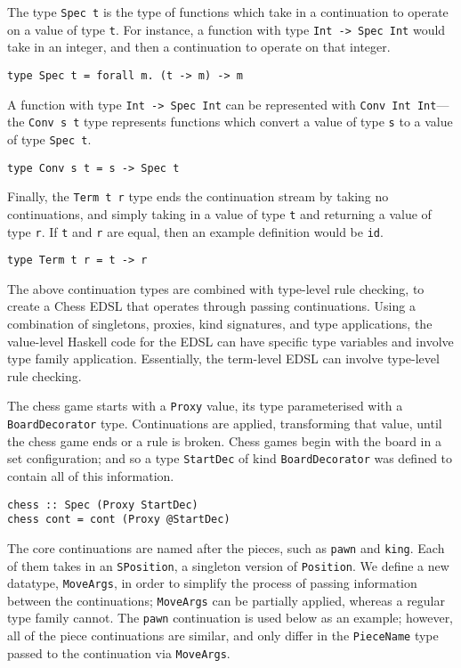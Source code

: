 \documentclass[12pt, a4paper, bibliography=totocnumbered]{scrreprt}
\newcommand{\inline}[1]{\lstinline[basicstyle=\ttfamily\footnotesize]{#1}}
\begin{document}
The type \inline{Spec t} is the type of functions which take in a continuation to operate on a value of type \inline{t}. For instance, a function with type \inline{Int -> Spec Int} would take in an integer, and then a continuation to operate on that integer.

\begin{lstlisting}
type Spec t = forall m. (t -> m) -> m
\end{lstlisting}

A function with type \inline{Int -> Spec Int} can be represented with \inline{Conv Int Int}---the \inline{Conv s t} type represents functions which convert a value of type \inline{s} to a value of type \inline{Spec t}.

\begin{lstlisting}
type Conv s t = s -> Spec t
\end{lstlisting}

Finally, the \inline{Term t r} type ends the continuation stream by taking no continuations, and simply taking in a value of type \inline{t} and returning a value of type \inline{r}. If \inline{t} and \inline{r} are equal, then an example definition would be \inline{id}.

\begin{lstlisting}
type Term t r = t -> r
\end{lstlisting}

The above continuation types are combined with type-level rule checking, to create a Chess EDSL that operates through passing continuations. Using a combination of singletons, proxies, kind signatures, and type applications, the value-level Haskell code for the EDSL can have specific type variables and involve type family application. Essentially, the term-level EDSL can involve type-level rule checking.

The chess game starts with a \inline{Proxy} value, its type parameterised with a \inline{BoardDecorator} type. Continuations are applied, transforming that value, until the chess game ends or a rule is broken. Chess games begin with the board in a set configuration; and so a type \inline{StartDec} of kind \inline{BoardDecorator} was defined to contain all of this information.

\begin{lstlisting}
chess :: Spec (Proxy StartDec)
chess cont = cont (Proxy @StartDec)
\end{lstlisting}

The core continuations are named after the pieces, such as \inline{pawn} and \inline{king}. Each of them takes in an \inline{SPosition}, a singleton version of \inline{Position}. We define a new datatype, \inline{MoveArgs}, in order to simplify the process of passing information between the continuations; \inline{MoveArgs} can be partially applied, whereas a regular type family cannot. The \inline{pawn} continuation is used below as an example; however, all of the piece continuations are similar, and only differ in the \inline{PieceName} type passed to the continuation via \inline{MoveArgs}.
\end{document}
